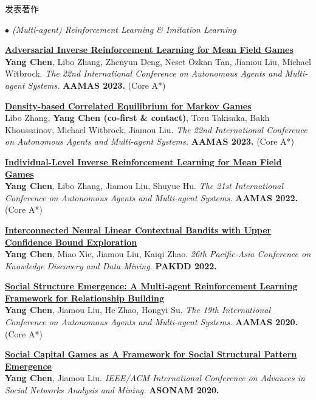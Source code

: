 \documentclass{resume} %
\begin{document}
\begin{rSection}{发表著作}
\begin{rSubsection}{\large\em $\bullet$ (Multi-agent) Reinforcement Learning \& Imitation Learning}{}{}{}
	\item {\href{https://www.ifaamas.org/Proceedings/aamas2023/pdfs/p1088.pdf}{\bf Adversarial Inverse Reinforcement Learning for Mean Field Games}}\\
		\textbf{Yang Chen}, Libo Zhang, Zhenyun Deng, Neset \"{O}zkan Tan, Jiamou Liu, Michael Witbrock. {\em The 22nd International Conference on Autonomous Agents and Multi-agent Systems.} \textbf{AAMAS 2023.} (Core A*)\\
	\item {\href{https://www.ifaamas.org/Proceedings/aamas2023/pdfs/p652.pdf}{\bf Density-based Correlated Equilibrium for Markov Games}}\\
		Libo Zhang, \textbf{Yang Chen (co-first \& contact)}, Toru Takisaka, Bakh Khoussainov, Michael Witbrock, Jiamou Liu. {\em The 22nd International Conference on Autonomous Agents and Multi-agent Systems.} \textbf{AAMAS 2023.} (Core A*)\\
	\item {\href{https://ifaamas.org/Proceedings/aamas2022/pdfs/p253.pdf}{\bf Individual-Level Inverse Reinforcement Learning for Mean Field Games}}\\
		\textbf{Yang Chen}, Libo Zhang, Jiamou Liu, Shuyue Hu. {\em The 21st International Conference on Autonomous Agents and Multi-agent Systems.} \textbf{AAMAS 2022.} (Core A*)\\
	\item {\href{https://link.springer.com/chapter/10.1007/978-3-031-05933-9_14}{\bf Interconnected Neural Linear Contextual Bandits with Upper Confidence Bound Exploration}}\\
		\textbf{Yang Chen}, Miao Xie, Jiamou Liu, Kaiqi Zhao. {\em 26th Pacific-Asia Conference on Knowledge Discovery and Data Mining.} \textbf{PAKDD 2022.} \\
	\item {\href{http://www.ifaamas.org/Proceedings/aamas2020/pdfs/p1807.pdf}{\bf Social Structure Emergence: A Multi-agent Reinforcement Learning Framework for Relationship Building}}\\ 
		\textbf{Yang Chen}, Jiamou Liu, He Zhao, Hongyi Su. {\em The 19th International Conference on Autonomous Agents and Multi-agent Systems.} \textbf{AAMAS 2020.} (Core A*)\\
	\item {\href{https://web.ntpu.edu.tw/~myday/doc/ASONAM2020/ASONAM2020_Proceedings/pdf/papers/049_064_309.pdf}{\bf Social Capital Games as A Framework for Social Structural Pattern Emergence}}\\ 
		\textbf{Yang Chen}, Jiamou Liu. {\em IEEE/ACM International Conference on Advances in Social Networks Analysis and Mining.} \textbf{ASONAM 2020.}\\
\end{rSubsection}


\end{rSection}
\end{document}
